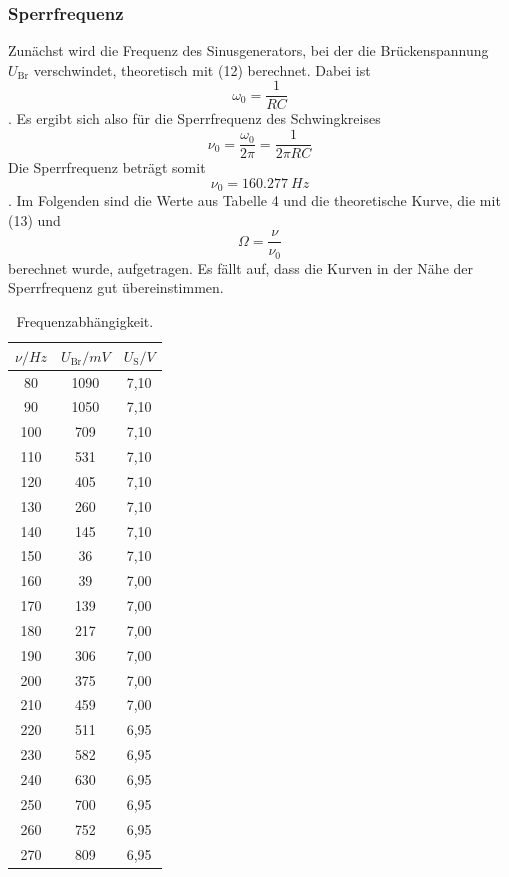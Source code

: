 \subsubsection{Sperrfrequenz}
Zunächst wird die Frequenz des Sinusgenerators, bei der die Brückenspannung $U_\text{Br}$ verschwindet, theoretisch mit (12) berechnet.
Dabei ist
\begin{equation*}
    \omega_0 = \frac{1}{RC}
\end{equation*}.
Es ergibt sich also für die Sperrfrequenz des Schwingkreises
\begin{equation}
    \nu_0 = \frac{\omega_0}{2\pi} = \frac{1}{2\pi RC}
\end{equation}
Die Sperrfrequenz beträgt somit
\begin{equation*}
    \nu_0 = \SI{160,277}{Hz}
\end{equation*}.
Im Folgenden sind die Werte aus Tabelle 4 und die theoretische Kurve, die mit (13) und
\begin{equation*}
    \Omega = \frac{\nu}{\nu_0}
\end{equation*} berechnet wurde, aufgetragen.
Es fällt auf, dass die Kurven in der Nähe der Sperrfrequenz gut übereinstimmen.

\begin{table}[H]
    \begin{center}
      \caption{Frequenzabhängigkeit.}
      \label{tab:Tabelle 4}
      \begin{tabular}{c|c|c} 
        \textbf{$\nu / Hz$ } & \textbf{$U_\text{Br} / mV$} & \textbf{$U_\text{S} / V$}\\
        \hline
        80 & 1090 & 7,10\\
        90 & 1050 & 7,10\\
        100 & 709 & 7,10\\
        110 & 531 & 7,10\\
        120 & 405 & 7,10\\
        130 & 260 & 7,10\\
        140 & 145 & 7,10\\
        150 & 36 & 7,10\\
        160 & 39 & 7,00\\
        170 & 139 & 7,00\\
        180 & 217 & 7,00\\
        190 & 306 & 7,00\\
        200 & 375 & 7,00\\
        210 & 459 & 7,00\\
        220 & 511 & 6,95\\
        230 & 582 & 6,95\\
        240 & 630 & 6,95\\
        250 & 700 & 6,95\\
        260 & 752 & 6,95\\
        270 & 809 & 6,95\\
      \end{tabular}
    \end{center}
\end{table}


